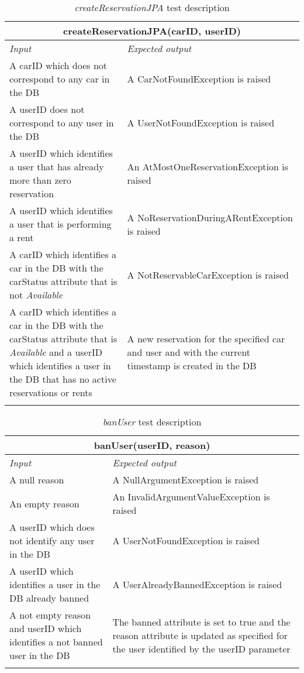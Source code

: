 \clearpage

\begin{longtable}{p{0.4\linewidth}p{0.6\linewidth}}
\multicolumn{2}{c}{\textbf{createReservationJPA(carID, userID)}} \\
\toprule
\emph{Input} & \emph{Expected output} \\
\midrule
A carID which does not correspond to any car in the DB & A CarNotFoundException is raised \\
\midrule
A userID does not correspond to any user in the DB & A UserNotFoundException is raised \\
\midrule
A userID which identifies a user that has already more than zero reservation & An AtMostOneReservationException is raised \\
\midrule
A userID which identifies a user that is performing a rent & A NoReservationDuringARentException is raised \\
\midrule
A carID which identifies a car in the DB with the carStatus attribute that is not \emph{Available} & A NotReservableCarException is raised \\
\midrule
A carID which identifies a car in the DB with the carStatus attribute that is \emph{Available} and a userID which identifies a user in the DB that has no active reservations or rents & A new reservation for the specified car and user and with the current timestamp is created in the DB\\
\bottomrule
\caption{\emph{createReservationJPA} test description}
\end{longtable}

\begin{longtable}{p{0.35\linewidth}p{0.65\linewidth}}
\multicolumn{2}{c}{\textbf{banUser(userID, reason)}} \\
\toprule
\emph{Input} & \emph{Expected output} \\
\midrule
A null reason & A NullArgumentException is raised\\
\midrule
An empty reason & An InvalidArgumentValueException is raised\\
\midrule
A userID which does not identify any user in the DB & A UserNotFoundException is raised\\
\midrule
A userID which identifies a user in the DB already banned & A UserAlreadyBannedException is raised\\
\midrule
A not empty reason and userID which identifies a not banned user in the DB & The banned attribute is set to true and the reason attribute is updated as specified for the user identified by the userID parameter\\
\bottomrule
\caption{\label{tbl:banUser}\emph{banUser} test description}
\end{longtable}

